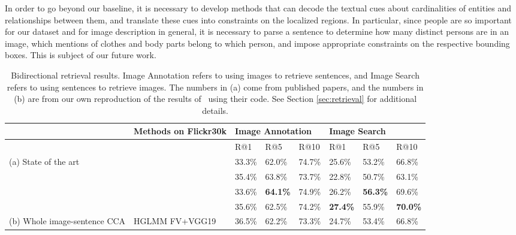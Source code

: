 \documentclass[twocolumn]{svjour3}
\begin{document}
In order to go beyond our baseline, it is necessary to develop methods that can decode the textual cues about cardinalities of entities and relationships between them, and translate these cues into constraints on the localized regions. In particular, since people are so important for our dataset and for image description in general, it is necessary to parse a sentence to determine how many distinct persons are in an image, which mentions of clothes and body parts belong to which person, and impose appropriate constraints on the respective bounding boxes. This is subject of our future work.










 \begin{table*}[t]
\centering
\caption{Bidirectional retrieval results. Image Annotation refers to using images to retrieve sentences, and Image Search refers to using sentences to retrieve images. The numbers in (a) come from published papers, and the numbers in (b) are from our own reproduction of the results of~\cite{klein2014fisher} using their code. See Section \ref{sec:retrieval} for additional details.}
\label{table:flickr30k}
\small
\begin{center}
\begin{tabular}{|l|l|l|l|l|l|l|l|}
\hline
& Methods on Flickr30k                         & \multicolumn{3}{l|}{Image Annotation}                                                                                     & \multicolumn{3}{l|}{Image Search}                                                                                        \\ \hline
&                                             & R@1                                    & R@5                                    & R@10                                   & R@1                                    & R@5                                    & R@10                                   \\ \hline
(a) State of the art  
& {{\citet{klein2014fisher}}}   & { {33.3\%}} & { {62.0\%}} & { {74.7\%}} & { {25.6\%}} & { {53.2\%}} & { {66.8\%}} \\
& {{\citet{mao2014deep}}}   & { {35.4\%}} & { {63.8\%}} & { {73.7\%}} & { {22.8\%}} & { {50.7\%}} & { {63.1\%}} \\ 
& {{\citet{ma2015}}}   & { {33.6\%}} & { \textbf {64.1\%}} & { {74.9\%}} & { {26.2\%}} & { \textbf{56.3\%}} & { {69.6\%}} \\ 
& {{\citet{klein2015rnn}}}   & { {35.6\%}} & { {62.5\%}} & { {74.2\%}} & { \textbf{27.4\%}} & { {55.9\%}} & { \textbf{70.0\%}} \\ 
\hline
(b) Whole image-sentence CCA & {{HGLMM FV+VGG19}}   & { {36.5\%}} & { {62.2\%}} & { {73.3\%}} & { {24.7\%}} & { {53.4\%}} & { {66.8\%}} \\
\hline




\end{tabular}
\end{center}
\end{table*}
\end{document}
